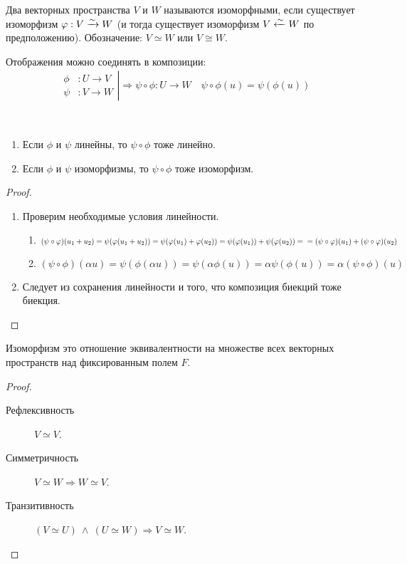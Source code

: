 \begin{Def}
Два векторных пространства $V$ и $W$ называются изоморфными, если существует изоморфизм $\phi: V \isom W$ (и тогда существует изоморфизм $V \leftisom W$ по предположению). Обозначение: $V \simeq W$ или $V \cong W$.
\end{Def}

Отображения можно соединять в композиции:
\begin{gather*}
\left.
\begin{aligned}
\phi&: U \rightarrow V \\
\psi&: V \rightarrow W
\end{aligned}
\right|\Rightarrow \psi \circ \phi : U \rightarrow W \quad \psi \circ \phi(u) = \psi(\phi(u))
\end{gather*}

\begin{Suggestion}\ 
\begin{enumerate}
\item Если $\phi$ и $\psi$ линейны, то $\psi \circ \phi$ тоже линейно.
\item Если $\phi$ и $\psi$ изоморфизмы, то $\psi \circ \phi$ тоже изоморфизм.
\end{enumerate}
\end{Suggestion}

\begin{proof} \ 
\begin{enumerate}
\item Проверим необходимые условия линейности.
\begin{enumerate}
\item $(\psi \circ \phi)(u_1 + u_2) = \psi(\phi(u_1 + u_2)) = \psi(\phi(u_1) + \phi(u_2)) = \psi(\phi(u_1)) + \psi(\phi(u_2)) = \\ = (\psi \circ\phi)(u_1) + (\psi \circ \phi)(u_2)$
\item $(\psi \circ \phi)(\alpha u) = \psi(\phi(\alpha u)) = \psi(\alpha\phi(u)) = \alpha \psi(\phi(u)) = \alpha (\psi \circ \phi) (u)$
\end{enumerate}
\item Следует из сохранения линейности и того, что композиция биекций тоже биекция.
\end{enumerate}
\end{proof}

\begin{Consequence}
Изоморфизм это отношение эквивалентности на множестве всех векторных пространств над фиксированным полем $F$.
\end{Consequence}
\begin{proof} \ 
\begin{description}
\item[Рефлексивность] $V \simeq V$.
\item[Симметричность] $V \simeq W \Rightarrow W \simeq V$.
\item[Транзитивность] $(V \simeq U)\ \land\ (U \simeq W) \Rightarrow V \simeq W$.
\end{description}
\end{proof}

